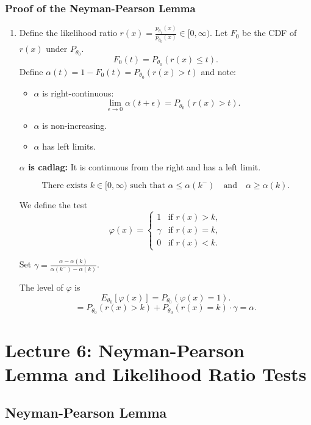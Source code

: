 \documentclass[open=any, 11pt,paper=A4]{scrreprt}
\begin{document}
\subsection{Proof of the Neyman-Pearson Lemma}
\begin{enumerate}
    \item Define the likelihood ratio \( r(x) = \frac{p_{\theta_1}(x)}{p_{\theta_0}(x)} \in [0, \infty) \). Let \( F_0 \) be the CDF of \( r(x) \) under \( P_{\theta_0} \).
    \[
    F_0(t) = P_{\theta_0} (r(x) \leq t).
    \]
    Define \( \alpha(t) = 1 - F_0(t) = P_{\theta_0} (r(x) > t) \) and note:
    \begin{itemize}
        \item \( \alpha \) is right-continuous:
        \[
        \lim_{\epsilon \to 0} \alpha(t + \epsilon) = P_{\theta_0} (r(x) > t).
        \]
        \item \( \alpha \) is non-increasing.
        \item \( \alpha \) has left limits.
    \end{itemize}

    \textbf{\( \alpha \) is cadlag:} It is continuous from the right and has a left limit.

    \[
    \text{There exists } k \in [0, \infty) \text{ such that }
    \alpha \leq \alpha(k^-) \quad \text{and} \quad \alpha \geq \alpha(k).
    \]

    We define the test
    \[
    \varphi(x) = 
    \begin{cases} 
      1 & \text{if } r(x) > k, \\
      \gamma & \text{if } r(x) = k, \\
      0 & \text{if } r(x) < k.
    \end{cases}
    \]
    
    Set \(\gamma = \frac{\alpha - \alpha(k)}{\alpha(k^-) - \alpha(k)}\).

    The level of \( \varphi \) is
    \[
    E_{\theta_0} [\varphi(x)] = P_{\theta_0} (\varphi(x) = 1).
    \]
    \[
    = P_{\theta_0} (r(x) > k) + P_{\theta_0} (r(x) = k) \cdot \gamma = \alpha.
    \]
\end{enumerate}
\chapter{Lecture 6: Neyman-Pearson Lemma and Likelihood Ratio Tests}
\section*{Neyman-Pearson Lemma}
\end{document}
